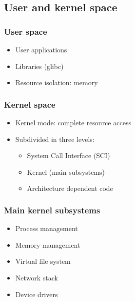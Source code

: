 \documentclass{beamer}
\begin{document}
\subsection{User and kernel space}
\begin{frame}
\frametitle{User space}

\begin{itemize}
\item User applications
\item Libraries (glibc)
\item Resource isolation: memory
\end{itemize}

\end{frame}


\begin{frame}
\frametitle{Kernel space}

\begin{itemize}
\item Kernel mode: complete resource access 
\item Subdivided in three levels:
\begin{itemize}
\item System Call Interface (SCI)
\item Kernel (main subsystems)
\item Architecture dependent code
\end{itemize}
\end{itemize}

\end{frame}



\begin{frame}
\frametitle{Main kernel subsystems}

\begin{itemize}
\item Process management
\item Memory management
\item Virtual file system 
\item Network stack
\item Device drivers
\end{itemize}

\end{frame}

\end{document}
